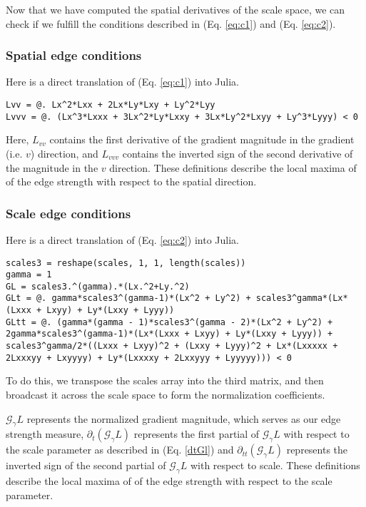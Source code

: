\documentclass{article}
\begin{document}
Now that we have computed the spatial derivatives of the scale space, we can check if we fulfill the conditions described in (Eq. \ref{eq:c1}) and (Eq. \ref{eq:c2}).

\subsubsection{Spatial edge conditions}
Here is a direct translation of (Eq. \ref{eq:c1}) into Julia.
\begin{lstlisting}
Lvv = @. Lx^2*Lxx + 2Lx*Ly*Lxy + Ly^2*Lyy
Lvvv = @. (Lx^3*Lxxx + 3Lx^2*Ly*Lxxy + 3Lx*Ly^2*Lxyy + Ly^3*Lyyy) < 0
\end{lstlisting}
Here, $L_{vv}$ contains the first derivative of the gradient magnitude in the gradient (i.e. $v$) direction, and $L_{vvv}$ contains the inverted sign of the second derivative of the magnitude in the $v$ direction.
These definitions describe the local maxima of of the edge strength with respect to the spatial direction.

\subsubsection{Scale edge conditions}
Here is a direct translation of (Eq. \ref{eq:c2}) into Julia.
\begin{lstlisting}
scales3 = reshape(scales, 1, 1, length(scales))
gamma = 1
GL = scales3.^(gamma).*(Lx.^2+Ly.^2)
GLt = @. gamma*scales3^(gamma-1)*(Lx^2 + Ly^2) + scales3^gamma*(Lx*(Lxxx + Lxyy) + Ly*(Lxxy + Lyyy))
GLtt = @. (gamma*(gamma - 1)*scales3^(gamma - 2)*(Lx^2 + Ly^2) + 2gamma*scales3^(gamma-1)*(Lx*(Lxxx + Lxyy) + Ly*(Lxxy + Lyyy)) + scales3^gamma/2*((Lxxx + Lxyy)^2 + (Lxxy + Lyyy)^2 + Lx*(Lxxxxx + 2Lxxxyy + Lxyyyy) + Ly*(Lxxxxy + 2Lxxyyy + Lyyyyy))) < 0
\end{lstlisting}
To do this, we transpose the scales array into the third matrix, and then broadcast it across the scale space to form the normalization coefficients.

$\mathcal G_\gamma L$ represents the normalized gradient magnitude, which serves as our edge strength measure, $\partial_t(\mathcal G_\gamma L)$ represents the first partial of $\mathcal G_\gamma L$ with respect to the scale parameter as described in (Eq. \ref{dtGl})
and $\partial_{tt}(\mathcal G_\gamma L)$ represents the inverted sign of the second partial of $\mathcal G_\gamma L$ with respect to scale.
These definitions describe the local maxima of of the edge strength with respect to the scale parameter.
\end{document}
